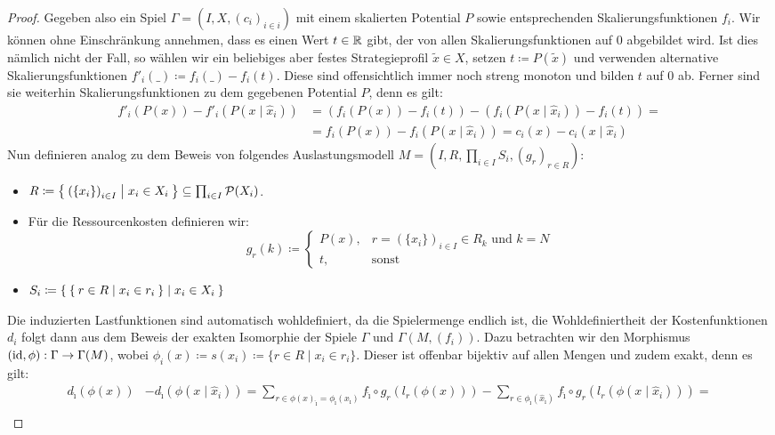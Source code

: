 \begin{proof}
	Gegeben also ein Spiel $\Gamma = (I, X, (c_i)_{i\in i})$ mit einem skalierten Potential $P$ sowie entsprechenden Skalierungsfunktionen $f_i$. Wir können ohne Einschränkung annehmen, dass es einen Wert $t \in \mathbb{R}$ gibt, der von allen Skalierungsfunktionen auf $0$ abgebildet wird. Ist dies nämlich nicht der Fall, so wählen wir ein beliebiges aber festes Strategieprofil $\widetilde{x} \in X$, setzen $t \coloneqq P(\widetilde{x})$ und verwenden alternative Skalierungsfunktionen $f'_i(\_) \coloneqq f_i(\_) - f_i(t)$. Diese sind offensichtlich immer noch streng monoton und bilden $t$ auf $0$ ab. Ferner sind sie weiterhin Skalierungsfunktionen zu dem gegebenen Potential $P$, denn es gilt:
		\begin{align*}
			f'_i(P(x)) - f'_i(P(x\mid \hat{x}_i)) 	&= \left(f_i(P(x)) - f_i(t)\right) - \left(f_i(P(x \mid \hat{x}_i)) - f_i(t)\right) = \\
													&= f_i(P(x)) - f_i(P(x\mid \hat{x}_i)) = c_i(x) - c_i(x \mid \hat{x}_i)
		\end{align*}
	Nun definieren analog zu dem Beweis von  folgendes Auslastungsmodell $M = (I, R, \prod_{i \in I} S_i, (g_r)_{r \in R})$:
	\begin{itemize}
		\item $R \coloneqq \Set{\left(\{x_i\}\right)_{i \in I} | x_i \in X_i } \subseteq \prod_{i \in I}\mathcal{P}(X_i)$.
		\item Für die Ressourcenkosten definieren wir:
			\[g_r(k) \coloneqq 
				\begin{cases}
					P(x), 					&r = \left(\{x_i\}\right)_{i \in I} \in R_k 													\text{ und } k=N \\
					t,						&\text{sonst}
				\end{cases}\]
		\item $S_i \coloneqq \Set{ \Set{r \in R | x_i \in r_i} | x_i \in X_i }$
	\end{itemize}
	Die induzierten Lastfunktionen sind automatisch wohldefiniert, da die Spielermenge endlich ist, die Wohldefiniertheit der Kostenfunktionen $d_i$ folgt dann aus dem Beweis der exakten Isomorphie der Spiele $\Gamma$ und $\Gamma(M, (f_i))$. Dazu betrachten wir den Morphismus $(\mathrm{id}, \phi): \Gamma \to \Gamma(M)$, wobei $\phi_i(x) \coloneqq s(x_i) \coloneqq \{r \in R \mid x_i \in r_i\}$. Dieser ist offenbar bijektiv auf allen Mengen und zudem exakt, denn es gilt:
	\begin{align*}
	d_{\hat{\imath}}(\phi(x)) &- d_{\hat{\imath}}(\phi(x \mid \hat{x}_i)) =\sum_{r \in \phi(x)_{\hat{\imath}} = \phi_{\hat{\imath}}(x_{\hat{\imath}})} f_{\hat{\imath}} \circ g_r(l_r(\phi(x))) - \sum_{r \in \phi_{\hat{\imath}}(\hat{x}_{\hat{\imath}})} f_{\hat{\imath}} \circ g_r(l_r(\phi(x \mid \hat{x}_i))) = \\

\end{align*}
\end{proof}
